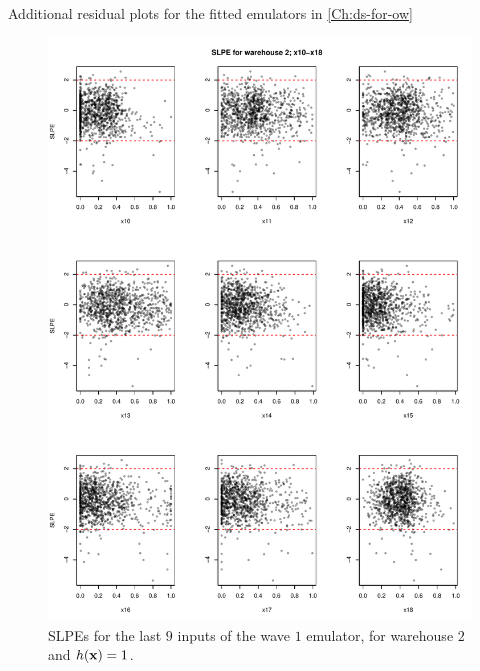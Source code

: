 \begin{chapter}{Additional residual plots  for the fitted emulators in \cref{Ch:ds-for-ow} \label{App:resid}}
\begin{figure}
  \centering
  \includegraphics[width=\textwidth]{fig-app-ds/w1-w2-2.pdf}
  \caption{SLPEs for the last $9$ inputs of the wave $1$ emulator, for warehouse $2$ and $h(\mathbf{x}) = 1$.}
\end{figure}
\begin{figure}
  \centering

\end{figure}
\end{chapter}
